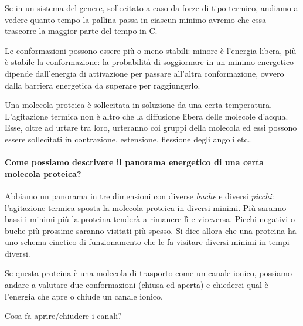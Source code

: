 \documentclass[a4paper,12pt]{article}
\begin{document}
Se in un sistema del genere, sollecitato a caso da forze di
tipo termico, andiamo a vedere quanto tempo la pallina
passa in ciascun minimo avremo che essa trascorre la
maggior parte del tempo in C.

Le conformazioni possono essere più o meno stabili: minore è l'energia libera, più è stabile la conformazione: la probabilità di soggiornare in un minimo energetico dipende dall'energia di attivazione per passare all'altra conformazione, ovvero dalla barriera energetica da
superare per raggiungerlo.

Una molecola proteica è sollecitata in soluzione da una certa temperatura. L’agitazione
termica non è altro che la diffusione libera delle molecole d’acqua. Esse, oltre ad urtare tra
loro, urteranno coi gruppi della molecola ed essi possono essere sollecitati in contrazione,
estensione, flessione degli angoli etc..

\paragraph{Come possiamo descrivere il panorama energetico di una
certa molecola proteica?} Abbiamo un panorama in tre
dimensioni con diverse \emph{buche} e diversi \emph{picchi}:
l’agitazione termica sposta la molecola proteica in diversi
minimi. Più saranno bassi i minimi più la proteina tenderà a rimanere lì e viceversa. Picchi negativi o buche più
prossime saranno visitati più spesso. Si dice allora che
una proteina ha uno schema cinetico di funzionamento
che le fa visitare diversi minimi in tempi diversi.

Se questa proteina è una molecola di trasporto come un canale ionico, possiamo andare a
valutare due conformazioni (chiusa ed aperta) e chiederci qual è l’energia che apre o
chiude un canale ionico.

Cosa fa aprire/chiudere i canali?
\end{document}
